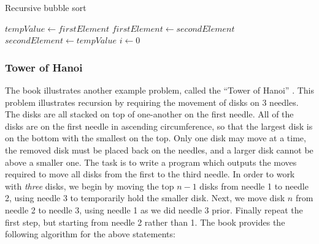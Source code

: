 \documentclass[12pt]{article}
\theoremstyle{definition}
\theoremstyle{plain}
\begin{document}
          \begin{algorithm}[H]
            \caption{Recursive bubble sort}
            \begin{algorithmic}[1]
                \State $tempValue\gets firstElement$
                \State $firstElement\gets secondElement$
                \State $secondElement\gets tempValue$
              \EndProcedure
              \State
               
                \State $i\gets 0$
                \State
                 
                    \State \Return
                \EndIf
                \State
                    \State {}
                  \EndIf
                \EndFor
                \State
                \State {}
              \EndProcedure
            \end{algorithmic}
          \end{algorithm}
          
        \subsubsection{Tower of Hanoi}
          The book illustrates another example problem, called the ``Tower of
            Hanoi'' \autocite{malik_2015}. This problem illustrates recursion
            by requiring the movement of disks on 3 needles. The disks are all
            stacked on top of one-another on the first needle. All of the
            disks are on the first needle in ascending circumference, so that
            the largest disk is on the bottom with the smallest on the top. Only
            one disk may move at a time, the removed disk must be placed back
            on the needles, and a larger disk cannot be above a smaller one. The
            task is to write a program which outputs the moves required to move
            all disks from the first to the third needle. In order to work with
            \textit{three} disks, we begin by moving the top $n-1$ disks from
            needle 1 to needle 2, using needle 3 to temporarily hold the smaller
            disk. Next, we move disk $n$ from needle 2 to needle 3, using
            needle 1 as we did needle 3 prior. Finally repeat the first step,
            but starting from needle 2 rather than 1. The book provides the
            following algorithm for the above statements:
\end{document}
